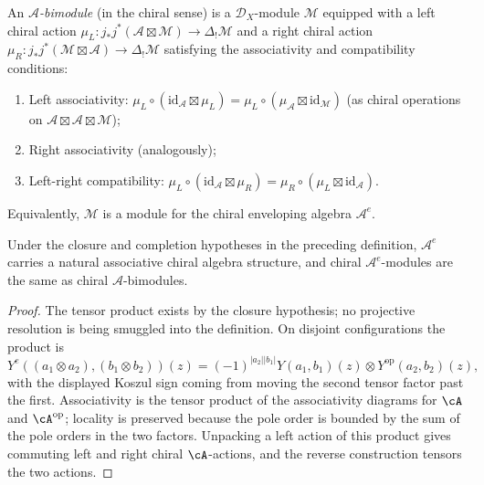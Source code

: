 \begin{definition}\label{def:chiral-bimodule}
An \emph{$\mathcal{A}$-bimodule} (in the chiral sense) is a $\mathcal{D}_X$-module $\mathcal{M}$ equipped with a left chiral action $\mu_L\colon j_*j^*(\mathcal{A} \boxtimes \mathcal{M}) \to \Delta_! \mathcal{M}$ and a right chiral action $\mu_R\colon j_*j^*(\mathcal{M} \boxtimes \mathcal{A}) \to \Delta_! \mathcal{M}$ satisfying the associativity and compatibility conditions:
\begin{enumerate}
\item Left associativity: $\mu_L \circ (\mathrm{id}_\mathcal{A} \boxtimes \mu_L) = \mu_L \circ (\mu_\mathcal{A} \boxtimes \mathrm{id}_\mathcal{M})$ (as chiral operations on $\mathcal{A} \boxtimes \mathcal{A} \boxtimes \mathcal{M}$);
\item Right associativity (analogously);
\item Left-right compatibility: $\mu_L \circ (\mathrm{id}_\mathcal{A} \boxtimes \mu_R) = \mu_R \circ (\mu_L \boxtimes \mathrm{id}_\mathcal{A})$.
\end{enumerate}
Equivalently, $\mathcal{M}$ is a module for the chiral enveloping algebra $\mathcal{A}^e$.
\end{definition}

\begin{lemma}
\label{lem:chiral-enveloping-well-defined}
Under the closure and completion hypotheses in the preceding
definition, $\mathcal{A}^e$ carries a natural associative chiral
algebra structure, and chiral $\mathcal{A}^e$-modules are the same
as chiral $\mathcal{A}$-bimodules.
\end{lemma}

\begin{proof}
The tensor product exists by the closure hypothesis; no projective
resolution is being smuggled into the definition.  On disjoint
configurations the product is
\[
Y^e((a_1 \otimes a_2), (b_1 \otimes b_2))(z)
=(-1)^{|a_2||b_1|}Y(a_1,b_1)(z)\otimes
Y^{\mathrm{op}}(a_2,b_2)(z),
\]
with the displayed Koszul sign coming from moving the second tensor
factor past the first.  Associativity is the tensor product of the
associativity diagrams for $\cA$ and $\cA^{\mathrm{op}}$; locality is
preserved because the pole order is bounded by the sum of the pole
orders in the two factors.  Unpacking a left action of this product
gives commuting left and right chiral $\cA$-actions, and the reverse
construction tensors the two actions. \qedhere
\end{proof}

